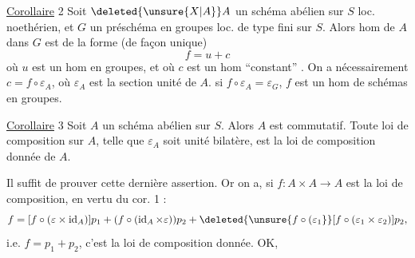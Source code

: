 \uline{Corollaire} 2 Soit $\deleted{\unsure{X|A}}A$ un schéma abélien sur $S$ loc. noethérien, et $G$ un préschéma en groupes loc. de type fini sur $S$. Alors  hom  de $A$ dans $G$ est de la forme (de façon unique)
\[
f=u+c
\]
où $u$ est un hom en groupes, et où $c$ est un hom ``constant'' . On a nécessairement $c=f\circ\varepsilon_A$, où $\varepsilon_A$ est la section unité de $A$.  si $f\circ\varepsilon_A=\varepsilon_G$, $f$ est un hom de schémas en groupes.

\uline{Corollaire} 3 Soit $A$ un schéma abélien sur $S$. Alors $A$ est commutatif. Toute loi de composition sur $A$, telle que $\varepsilon_A$  soit unité bilatère, est la loi de composition donnée de $A$.

Il suffit de prouver cette dernière assertion. Or on a, si $f:A\times A\longrightarrow A$ est la loi de composition, en vertu du cor. 1 :
\[
f=[f\circ(\varepsilon\times\operatorname{id}_A)]p_1+
(f\circ(\operatorname{id}_A\times\varepsilon))p_2+
\deleted{\unsure{f\circ(\varepsilon_1}}[f\circ(\varepsilon_1\times\varepsilon_2)]p_2,
\]
i.e. $f=p_1+p_2$, c'est la loi de composition donnée. OK,
